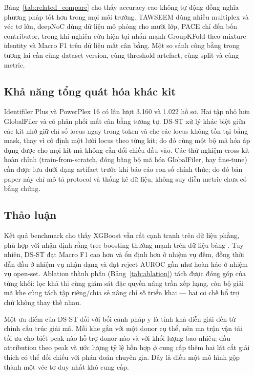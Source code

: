 \documentclass[12pt,a4paper]{article}
\begin{document}
Bảng~\ref{tab:related_compare} cho thấy accuracy cao không tự động đồng nghĩa phương pháp tốt hơn trong mọi môi trường. TAWSEEM dùng nhiều multiplex và véc tơ lớn, deepNoC dùng dữ liệu mô phỏng cho mười lớp, PACE chỉ đến bốn contributor, trong khi nghiên cứu hiện tại nhấn mạnh GroupKFold theo mixture identity và Macro F1 trên dữ liệu mất cân bằng. Một so sánh công bằng trong tương lai cần cùng dataset version, cùng threshold artefact, cùng split và cùng metric.

\subsection{Khả năng tổng quát hóa khác kit}

Identifiler Plus và PowerPlex 16 có lần lượt 3.160 và 1.022 hồ sơ. Hai tập nhỏ hơn GlobalFiler và có phân phối mất cân bằng tương tự. DS-ST xử lý khác biệt giữa các kit nhờ giữ chỉ số locus ngay trong token và che các locus không tồn tại bằng mask, thay vì cố định một lưới locus theo từng kit; do đó cùng một bộ mã hóa áp dụng được cho mọi kit mà không cần đổi chiều đầu vào. Các thử nghiệm cross-kit hoàn chỉnh (train-from-scratch, đóng băng bộ mã hóa GlobalFiler, hay fine-tune) cần được lưu dưới dạng artifact trước khi báo cáo con số chính thức; do đó bản paper này chỉ mô tả protocol và thống kê dữ liệu, không suy diễn metric chưa có bằng chứng.

\subsection{Thảo luận}

Kết quả benchmark cho thấy XGBoost vẫn rất cạnh tranh trên dữ liệu phẳng, phù hợp với nhận định rằng tree boosting thường mạnh trên dữ liệu bảng \cite{chen2016}. Tuy nhiên, DS-ST đạt Macro F1 cao hơn và ổn định hơn ở nhiệm vụ đếm, đồng thời dẫn đầu ở nhiệm vụ nhận dạng và đạt reject AUROC gần như hoàn hảo ở nhiệm vụ open-set. Ablation thành phần (Bảng~\ref{tab:ablation}) tách được đóng góp của từng khối: lọc khả thi cùng giám sát đặc quyền nâng trần xếp hạng, còn bộ giải mã khe cùng tách tập riêng/chia sẻ nâng chỉ số triển khai — hai cơ chế bổ trợ chứ không thay thế nhau.

Một ưu điểm của DS-ST đối với bối cảnh pháp y là tính khả diễn giải đến từ chính cấu trúc giải mã. Mỗi khe gắn với một donor cụ thể, nên ma trận vận tải tối ưu cho biết peak nào hỗ trợ donor nào và với khối lượng bao nhiêu; đầu attribution theo peak và ước lượng tỷ lệ hỗn hợp \(\phi\) cung cấp thêm hai lát cắt giải thích có thể đối chiếu với phán đoán chuyên gia. Đây là điều một mô hình gộp thành một véc tơ duy nhất khó cung cấp.
\end{document}
